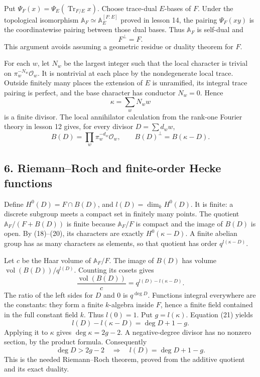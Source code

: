 \documentclass[11pt,a4paper]{article}
\begin{document}
Put \(\Psi_F(x)=\Psi_E(\operatorname{Tr}_{F/E}x)\). Choose trace-dual
\(E\)-bases of \(F\). Under the topological isomorphism
\(\mathbb A_F\simeq\mathbb A_E^{[F:E]}\) proved in lesson 14, the
pairing \(\Psi_F(xy)\) is the coordinatewise pairing between those dual
bases. Thus \(\mathbb A_F\) is self-dual and \[
F^\perp=F.
\tag{18}
\] This argument avoids assuming a geometric residue or duality theorem
for \(F\).

For each \(w\), let \(N_w\) be the largest integer such that the local
character is trivial on \(\pi_w^{-N_w}\mathcal O_w\). It is nontrivial
at each place by the nondegenerate local trace. Outside finitely many
places the extension of \(E\) is unramified, its integral trace pairing
is perfect, and the base character has conductor \(N_w=0\). Hence \[
\kappa=\sum_w N_w w
\tag{19}
\] is a finite divisor. The local annihilator calculation from the
rank-one Fourier theory in lesson 12 gives, for every divisor
\(D=\sum d_w w\), \[
B(D)=\prod_w\pi_w^{-d_w}\mathcal O_w,\qquad
B(D)^\perp=B(\kappa-D).
\tag{20}
\]

\subsection{6. Riemann--Roch and finite-order Hecke
functions}\label{riemannroch-and-finite-order-hecke-functions}

Define \(H^0(D)=F\cap B(D)\), and \(l(D)=\dim_k H^0(D)\). It is finite:
a discrete subgroup meets a compact set in finitely many points. The
quotient \(\mathbb A_F/(F+B(D))\) is finite because \(\mathbb A_F/F\) is
compact and the image of \(B(D)\) is open. By (18)--(20), its characters
are exactly \(H^0(\kappa-D)\). A finite abelian group has as many
characters as elements, so that quotient has order \(q^{l(\kappa-D)}\).

Let \(c\) be the Haar volume of \(\mathbb A_F/F\). The image of \(B(D)\)
has volume \(\operatorname{vol}(B(D))/q^{l(D)}\). Counting its cosets
gives \[
\frac{\operatorname{vol}(B(D))}{c}
=q^{l(D)-l(\kappa-D)}.
\tag{21}
\] The ratio of the left sides for \(D\) and \(0\) is \(q^{\deg D}\).
Functions integral everywhere are the constants: they form a finite
\(k\)-algebra inside \(F\), hence a finite field contained in the full
constant field \(k\). Thus \(l(0)=1\). Put \(g=l(\kappa)\). Equation
(21) yields \[
l(D)-l(\kappa-D)=\deg D+1-g.
\tag{22}
\] Applying it to \(\kappa\) gives \(\deg\kappa=2g-2\). A
negative-degree divisor has no nonzero section, by the product formula.
Consequently \[
\deg D>2g-2\quad\Longrightarrow\quad l(D)=\deg D+1-g.
\tag{23}
\] This is the needed Riemann--Roch theorem, proved from the additive
quotient and its exact duality.
\end{document}

